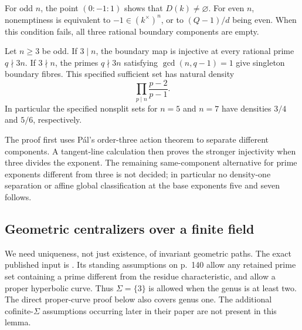 For odd \(n\), the point \((0:-1:1)\) shows that \(D(k)\ne\varnothing\).
For even \(n\), nonemptiness is equivalent to
\(-1\in(k^\times)^n\), or to \((Q-1)/d\) being even.
When this condition fails, all three rational boundary components
are empty.

\begin{corollary}
\label{cor:ff3-density}
Let \(n\ge3\) be odd. If \(3\mid n\), the boundary map is injective
at every rational prime \(q\nmid3n\). If \(3\nmid n\), the primes
\(q\nmid3n\) satisfying \(\gcd(n,q-1)=1\) give singleton boundary
fibres. This specified sufficient set has natural density
\begin{equation}
 \prod_{p\mid n}\frac{p-2}{p-1}.
 \label{eq:ff3-1-3}
\end{equation}
In particular the specified nonsplit sets for \(n=5\) and \(n=7\)
have densities \(3/4\) and \(5/6\), respectively.
\end{corollary}

The proof first uses Pál's order-three action theorem to separate
different components. A tangent-line calculation then proves the
stronger injectivity when three divides the exponent. The remaining
same-component alternative for prime exponents different from three
is not decided; in particular no density-one separation or affine
global classification at the base exponents five and seven follows.

\subsection{Geometric centralizers over a finite field}
\label{subsec:ff3-centralizers}

We need uniqueness, not just existence, of invariant geometric paths. The exact published input is \citet[Lemma~1.7, p.~144]{FCSaidiTamagawa2009}. Its standing assumptions on p.~140 allow any retained prime set containing a prime different from the residue characteristic, and allow a proper hyperbolic curve. Thus \(\Sigma=\{3\}\) is allowed when the genus is at least two. The direct proper-curve proof below also covers genus one. The additional cofinite-\(\Sigma\) assumptions occurring later in their paper are not present in this lemma.

